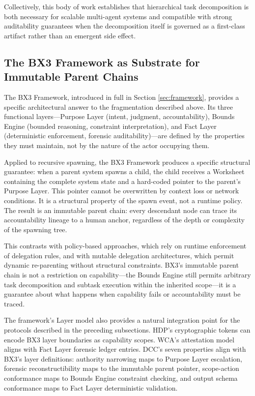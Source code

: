 Collectively, this body of work establishes that hierarchical task decomposition is both necessary for scalable multi-agent systems and compatible with strong auditability guarantees when the decomposition itself is governed as a first-class artifact rather than an emergent side effect.

\subsection{The BX3 Framework as Substrate for Immutable Parent Chains}

The BX3 Framework, introduced in full in Section \ref{sec:framework}, provides a specific architectural answer to the fragmentation described above. Its three functional layers—Purpose Layer (intent, judgment, accountability), Bounds Engine (bounded reasoning, constraint interpretation), and Fact Layer (deterministic enforcement, forensic auditability)—are defined by the properties they must maintain, not by the nature of the actor occupying them.

Applied to recursive spawning, the BX3 Framework produces a specific structural guarantee: when a parent system spawns a child, the child receives a Worksheet containing the complete system state and a hard-coded pointer to the parent's Purpose Layer. This pointer cannot be overwritten by context loss or network conditions. It is a structural property of the spawn event, not a runtime policy. The result is an immutable parent chain: every descendant node can trace its accountability lineage to a human anchor, regardless of the depth or complexity of the spawning tree.

This contrasts with policy-based approaches, which rely on runtime enforcement of delegation rules, and with mutable delegation architectures, which permit dynamic re-parenting without structural constraints. BX3's immutable parent chain is not a restriction on capability—the Bounds Engine still permits arbitrary task decomposition and subtask execution within the inherited scope—it is a guarantee about what happens when capability fails or accountability must be traced.

The framework's Layer model also provides a natural integration point for the protocols described in the preceding subsections. HDP's cryptographic tokens can encode BX3 layer boundaries as capability scopes. WCA's attestation model aligns with Fact Layer forensic ledger entries. DCC's seven properties align with BX3's layer definitions: authority narrowing maps to Purpose Layer escalation, forensic reconstructibility maps to the immutable parent pointer, scope-action conformance maps to Bounds Engine constraint checking, and output schema conformance maps to Fact Layer deterministic validation.

